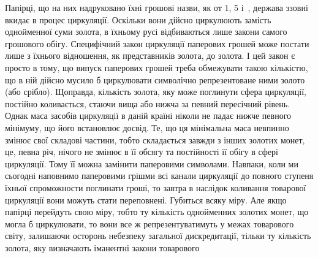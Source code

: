 Папірці, що на них надруковано їхні грошові назви, як от
1, 5 і~, держава ззовні
вкидає в процес циркуляції. Оскільки вони дійсно циркулюють
замість однойменної суми золота, в їхньому русі відбиваються
лише закони самого грошового обігу. Специфічний закон циркуляції
паперових грошей може постати лише з їхнього відношення,
як представників золота, до золота. І цей закон є просто в тому,
що випуск паперових грошей треба обмежувати такою кількістю,
що в ній дійсно мусило б циркулювати символічно репрезентоване
ними золото (або срібло). Щоправда, кількість золота, яку може
поглинути сфера циркуляції, постійно коливається, стаючи вища
або нижча за певний пересічний рівень. Однак маса засобів циркуляції
в даній країні ніколи не падає нижче певного мінімуму,
що його встановлює досвід. Те, що ця мінімальна маса невпинно
змінює свої складові частини, тобто складається завжди з інших
золотих монет, це, певна річ, нічого не змінює в її обсягу та постійності
її обігу в сфері циркуляції. Тому її можна замінити паперовими
символами. Навпаки, коли ми сьогодні наповнимо паперовими
грішми всі канали циркуляції до повного ступеня їхньої
спроможности поглинати гроші, то завтра в наслідок коливання
товарової циркуляції вони можуть стати переповнені. Губиться
всяку міру. Але якщо папірці перейдуть свою міру, тобто ту
кількість однойменних золотих монет, що могла б циркулювати,
то вони все ж репрезентуватимуть у межах товарового світу,
залишаючи осторонь небезпеку загальної дискредитації, тільки
ту кількість золота, яку визначають іманентні закони товарового
\parbreak{}  %
